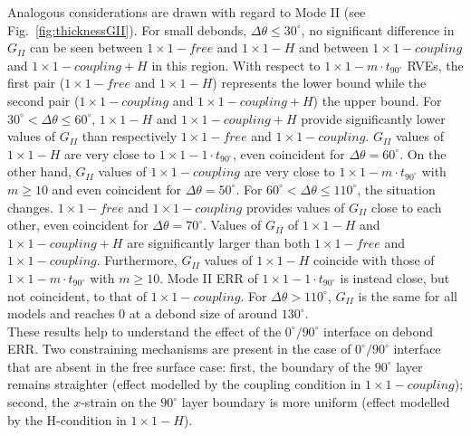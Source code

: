\documentclass[review]{elsarticle}
\begin{document}
Analogous considerations are drawn with regard to Mode II (see Fig.~\ref{fig:thicknessGII}). For small debonds, $\Delta\theta\leq30^{\circ}$, no significant difference in $G_{II}$ can be seen between $1\times 1-free$ and $1\times 1-H$ and between $1\times 1-coupling$ and $1\times 1-coupling+H$ in this region. With respect to $1\times 1-m\cdot t_{90^{\circ}}$ RVEs, the first pair ($1\times 1-free$ and $1\times 1-H$) represents the lower bound while the second pair ($1\times 1-coupling$ and $1\times 1-coupling+H$) the upper bound. For $30^{\circ}<\Delta\theta\leq60^{\circ}$, $1\times 1-H$ and $1\times 1-coupling+H$ provide significantly lower values of $G_{II}$ than respectively $1\times 1-free$ and $1\times 1-coupling$. $G_{II}$ values of $1\times 1-H$ are very close to $1\times 1-1\cdot t_{90^{\circ}}$, even coincident for $\Delta\theta=60^{\circ}$. On the other hand, $G_{II}$ values of $1\times 1-coupling$ are very close to $1\times 1-m\cdot t_{90^{\circ}}$ with $m\geq10$ and even coincident for $\Delta\theta=50^{\circ}$. For $60^{\circ}<\Delta\theta\leq110^{\circ}$, the situation changes. $1\times 1-free$ and $1\times 1-coupling$ provides values of $G_{II}$ close to each other, even coincident for $\Delta\theta=70^{\circ}$. Values of $G_{II}$ of $1\times 1-H$ and $1\times 1-coupling+H$ are significantly larger than both $1\times 1-free$ and $1\times 1-coupling$. Furthermore, $G_{II}$ values of $1\times 1-H$ coincide with those of $1\times 1-m\cdot t_{90^{\circ}}$ with $m\geq10$. Mode II ERR of $1\times 1-1\cdot t_{90^{\circ}}$ is instead close, but not coincident, to that of $1\times 1-coupling$. For $\Delta\theta>110^{\circ}$, $G_{II}$ is the same for all models and reaches $0$ at a debond size of around $130^{\circ}$.\\
These results help to understand the effect of the $0^{\circ}/90^{\circ}$ interface on debond ERR. Two constraining mechanisms are present in the case of $0^{\circ}/90^{\circ}$ interface that are absent in the free surface case: first, the boundary of the $90^{\circ}$ layer remains straighter (effect modelled by the coupling condition in $1\times 1-coupling$); second, the $x$-strain on the $90^{\circ}$ layer boundary is more uniform (effect modelled by the H-condition in $1\times 1-H$).\\
\end{document}
